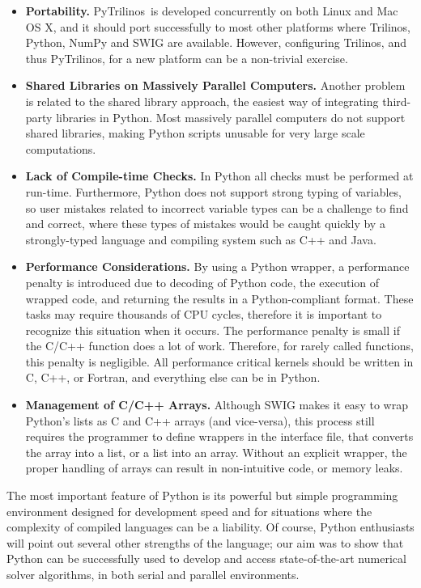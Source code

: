 \documentclass{llncs}
\newcommand{\PyTrilinos}{{\sc PyTrilinos}}
\begin{document}
\begin{itemize}
%
\item {\bf Portability.} \PyTrilinos\ is developed concurrently on
  both Linux and Mac OS X, and it should port successfully to most
  other platforms where Trilinos, Python, NumPy and SWIG are
  available.  However, configuring Trilinos, and thus \PyTrilinos, for
  a new platform can be a non-trivial exercise.
%
\item {\bf Shared Libraries on Massively Parallel Computers.} Another
  problem is related to the shared library approach, the
  easiest way of integrating third-party libraries in Python.  Most
  massively parallel computers do not support shared libraries,
  making Python scripts unusable for very large scale
  computations.
%
\item {\bf Lack of Compile-time Checks.} In Python all checks must be
  performed at run-time.  Furthermore, Python does not support strong
  typing of variables, so user mistakes related to incorrect variable
  types can be a challenge to find and correct, where these types of
  mistakes would be caught quickly by a strongly-typed language and
  compiling system such as C++ and Java.
%
\item {\bf Performance Considerations.}  By using a Python wrapper, a
  performance penalty is introduced due to decoding of Python code,
  the execution of wrapped code, and returning the results in a
  Python-compliant format.  These tasks may require thousands of CPU
  cycles, therefore it is important to recognize this situation when
  it occurs.  The performance penalty is small if the C/C++ function
  does a lot of work.  Therefore, for rarely called functions, this
  penalty is negligible.  All performance critical kernels should be
  written in C, C++, or Fortran, and everything else can be in Python.
%
\item {\bf Management of C/C++ Arrays.} Although SWIG makes it easy to
  wrap Python's lists as C and C++ arrays (and vice-versa), this
  process still requires the programmer to define wrappers in the
  interface file, that converts the array into a list, or a list into
  an array.  Without an explicit wrapper, the proper handling of
  arrays can result in non-intuitive code, or memory leaks.
\end{itemize}

The most important feature of Python is its powerful but
simple programming environment designed for development speed and for
situations where the complexity of compiled languages can be a
liability.  Of course, Python enthusiasts will point out several other
strengths of the language; our aim was to show that Python can be
successfully used to develop and access state-of-the-art numerical
solver algorithms, in both serial and parallel environments.
\end{document}
